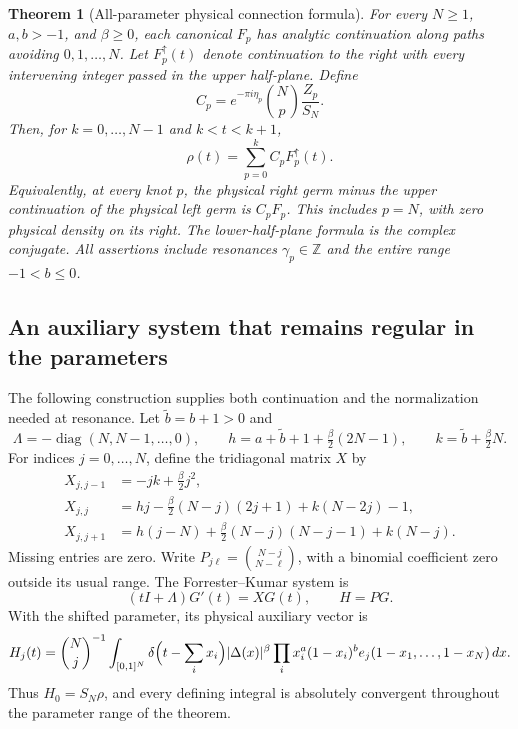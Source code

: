 \documentclass[11pt,a4paper]{article}
\newtheorem{theorem}{Theorem}[section]
\theoremstyle{definition}
\theoremstyle{remark}
\numberwithin{equation}{section}
\begin{document}
\begin{theorem}[All-parameter physical connection formula]
\label{p4:thm:JG:global}
For every $N\ge1$, $a,b>-1$, and $\beta\ge0$, each canonical
$F_p$ has analytic continuation along paths avoiding $0,1,\ldots,N$.
Let $F_p^\uparrow(t)$ denote continuation to the right with every
intervening integer passed in the upper half-plane. Define
\begin{equation}\label{p4:eq:JG:C}
 C_p=e^{-\pi i\eta_p}\binom Np\frac{Z_p}{S_N}.
\end{equation}
Then, for $k=0,\ldots,N-1$ and $k<t<k+1$,
\begin{equation}\label{p4:eq:JG:global}
 \boxed{\displaystyle \rho(t)=\sum_{p=0}^k C_pF_p^\uparrow(t).}
\end{equation}
Equivalently, at every knot $p$, the physical right germ minus the
upper continuation of the physical left germ is $C_pF_p$.
This includes $p=N$, with zero physical density on its right.
The lower-half-plane formula is the complex conjugate.
All assertions include resonances $\gamma_p\in\mathbb Z$ and
the entire range $-1<b\le0$.
\end{theorem}

\subsection{An auxiliary system that remains regular in the parameters}

The following construction supplies both continuation and the
normalization needed at resonance. Let $\widetilde b=b+1>0$ and
\[
 \Lambda=-\operatorname{diag}(N,N-1,\ldots,0),\qquad
 h=a+\widetilde b+1+\tfrac\beta2(2N-1),\qquad
 k=\widetilde b+\tfrac\beta2N.
\]
For indices $j=0,\ldots,N$, define the tridiagonal matrix $X$ by
\begin{align*}
 X_{j,j-1}&=-jk+\tfrac\beta2j^2,\\
 X_{j,j}&=hj-\tfrac\beta2(N-j)(2j+1)+k(N-2j)-1,\\
 X_{j,j+1}&=h(j-N)+\tfrac\beta2(N-j)(N-j-1)+k(N-j).
\end{align*}
Missing entries are zero. Write $P_{j\ell}=\binom{N-j}{N-\ell}$,
with a binomial coefficient zero outside its usual range.
The Forrester--Kumar system is
\begin{equation}\label{p4:eq:JG:system}
 (tI+\Lambda)G'(t)=XG(t),\qquad H=PG.
\end{equation}
With the shifted parameter, its physical auxiliary vector is
\[
 H_j(t)=\binom Nj^{-1}\int_{[0,1]^N}
  \delta\Bigl(t-\sum_i x_i\Bigr)|\Delta(x)|^\beta
  \prod_i x_i^a(1-x_i)^b e_j(1-x_1,\ldots,1-x_N)\,dx.
\]
Thus $H_0=S_N\rho$, and every defining integral is absolutely
convergent throughout the parameter range of the theorem.
\end{document}
